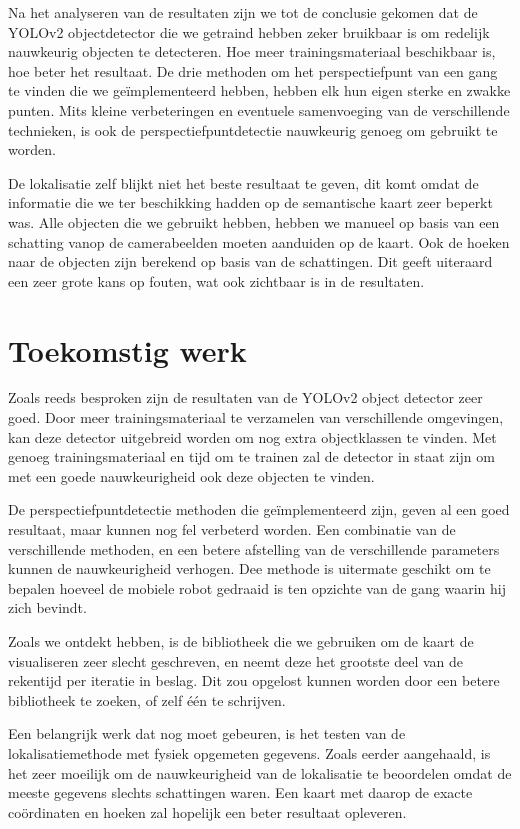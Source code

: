 Na het analyseren van de resultaten zijn we tot de conclusie gekomen dat de YOLOv2 objectdetector die we getraind hebben zeker bruikbaar is
om redelijk nauwkeurig objecten te detecteren. Hoe meer trainingsmateriaal beschikbaar is, hoe beter het resultaat.
De drie methoden om het perspectiefpunt van een gang te vinden die we ge\"{i}mplementeerd hebben, hebben elk hun eigen sterke en zwakke punten.
Mits kleine verbeteringen en eventuele samenvoeging van de verschillende technieken,
is ook de perspectiefpuntdetectie nauwkeurig genoeg om gebruikt te worden.

De lokalisatie zelf blijkt niet het beste resultaat te geven, dit komt omdat de informatie die we ter beschikking hadden op de semantische kaart zeer beperkt was.
Alle objecten die we gebruikt hebben, hebben we manueel op basis van een schatting vanop de camerabeelden moeten aanduiden op de kaart.
Ook de hoeken naar de objecten zijn berekend op basis van de schattingen.
Dit geeft uiteraard een zeer grote kans op fouten, wat ook zichtbaar is in de resultaten.


\section{Toekomstig werk}
Zoals reeds besproken zijn de resultaten van de YOLOv2 object detector zeer goed.
Door meer trainingsmateriaal te verzamelen van verschillende omgevingen, kan deze detector uitgebreid worden om nog extra objectklassen te vinden.
Met genoeg trainingsmateriaal en tijd om te trainen zal de detector in staat zijn om met een goede nauwkeurigheid ook deze objecten te vinden.

De perspectiefpuntdetectie methoden die ge\"{i}mplementeerd zijn, geven al een goed resultaat, maar kunnen nog fel verbeterd worden.
Een combinatie van de verschillende methoden, en een betere afstelling van de verschillende parameters kunnen de nauwkeurigheid verhogen.
Dee methode is uitermate geschikt om te bepalen hoeveel de mobiele robot gedraaid is ten opzichte van de gang waarin hij zich bevindt.

Zoals we ontdekt hebben, is de bibliotheek die we gebruiken om de kaart de visualiseren zeer slecht geschreven, en neemt deze het grootste deel van
de rekentijd per iteratie in beslag.
Dit zou opgelost kunnen worden door een betere bibliotheek te zoeken, of zelf \'{e}\'{e}n te schrijven.

Een belangrijk werk dat nog moet gebeuren, is het testen van de lokalisatiemethode met fysiek opgemeten gegevens.
Zoals eerder aangehaald, is het zeer moeilijk om de nauwkeurigheid van de lokalisatie te beoordelen omdat de meeste gegevens slechts schattingen waren.
Een kaart met daarop de exacte co\"{o}rdinaten en hoeken zal hopelijk een beter resultaat opleveren.